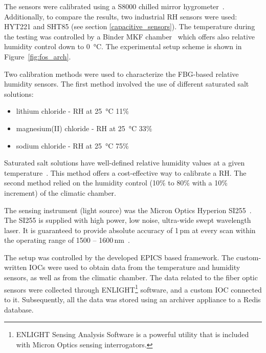 The sensors were calibrated using a S8000 chilled mirror hygrometer~\cite{michell_s8000}. Additionally, to compare the results, two industrial \gls{RH} sensors were used: HYT221 and SHT85 (see section \ref{capacitive_sensors}). The temperature during the testing was controlled by a Binder MKF chamber~\cite{binder} which offers also relative humidity control down to \SI{0}{\celsius}. The experimental setup scheme is shown in Figure~\ref{fig:fos_arch}. 

Two calibration methods were used to characterize the \gls{FBG}-based relative humidity sensors. The first method involved the use of different saturated salt solutions:
\begin{itemize}
    \item lithium chloride - \gls{RH} at \SI{25}{\celsius} 11\%
    \item magnesium(II) chloride - \gls{RH} at \SI{25}{\celsius} 33\%
    \item sodium chloride - \gls{RH} at \SI{25}{\celsius} 75\%
\end{itemize}
 Saturated salt solutions have well-defined relative humidity values at a given temperature~\cite{Fossa:687857}. This method offers a cost-effective way to calibrate a \gls{RH}. The second method relied on the humidity control (10\% to 80\% with a 10\% increment) of the climatic chamber.
 
 The sensing instrument (light source) was the Micron Optics Hyperion SI255~\cite{si255}. The SI255 is supplied with high power, low noise, ultra-wide swept wavelength laser. It is guaranteed to provide absolute accuracy of 1\,pm at every scan within the operating range of 1500 -- 1600\,nm~\cite{si255}.

The setup was controlled by the developed \gls{EPICS} based framework. The custom-written \glspl{IOC} were used to obtain data from the temperature and humidity sensors, as well as from the climatic chamber. The data related to the fiber optic sensors were collected through ENLIGHT\footnote{ENLIGHT Sensing Analysis Software is a powerful utility that is included with Micron
Optics sensing interrogators.} software, and a custom \gls{IOC} connected to it. Subsequently, all the data was stored using an archiver appliance to a Redis database. 

